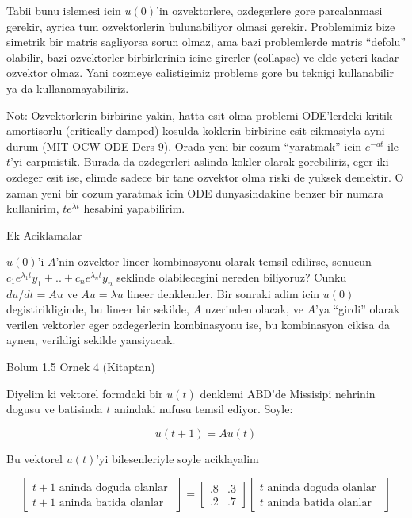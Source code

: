 \documentclass[12pt,fleqn]{article}\usepackage{../common}
\begin{document}
Tabii bunu islemesi icin $u(0)$'in ozvektorlere, ozdegerlere gore
parcalanmasi gerekir, ayrica tum ozvektorlerin bulunabiliyor olmasi
gerekir. Problemimiz bize simetrik bir matris sagliyorsa sorun olmaz, ama
bazi problemlerde matris ``defolu'' olabilir, bazi ozvektorler
birbirlerinin icine girerler (collapse) ve elde yeteri kadar ozvektor
olmaz. Yani cozmeye calistigimiz probleme gore bu teknigi kullanabilir ya
da kullanamayabiliriz. 

Not: Ozvektorlerin birbirine yakin, hatta esit olma problemi ODE'lerdeki
kritik amortisorlu (critically damped) kosulda koklerin birbirine esit
cikmasiyla ayni durum (MIT OCW ODE Ders 9). Orada yeni bir cozum
``yaratmak'' icin $e^{-at}$ ile $t$'yi carpmistik. Burada da ozdegerleri
aslinda kokler olarak gorebiliriz, eger iki ozdeger esit ise, elimde sadece
bir tane ozvektor olma riski de yuksek demektir. O zaman yeni bir cozum
yaratmak icin ODE dunyasindakine benzer bir numara kullanirim, $te^{\lambda
  t}$ 
hesabini yapabilirim. 

Ek Aciklamalar

$u(0)$'i $A$'nin ozvektor lineer kombinasyonu olarak temsil edilirse,
sonucun $c_1e^{\lambda_1t}y_1 + .. + c_ne^{\lambda_n t}y_n$ seklinde
olabilecegini nereden biliyoruz?  Cunku $du/dt = Au$ ve $Au = \lambda u$
lineer denklemler. Bir sonraki adim icin $u(0)$ degistirildiginde, bu
lineer bir sekilde, $A$ uzerinden olacak, ve $A$'ya ``girdi'' olarak
verilen vektorler eger ozdegerlerin kombinasyonu ise, bu kombinasyon cikisa
da aynen, verildigi sekilde yansiyacak.

Bolum 1.5 Ornek 4 (Kitaptan)

Diyelim ki vektorel formdaki bir $u(t)$ denklemi ABD'de Missisipi nehrinin
dogusu ve batisinda $t$ anindaki nufusu temsil ediyor. Soyle:

\[ u(t+1) = Au(t) \]

Bu vektorel $u(t)$'yi bilesenleriyle soyle aciklayalim

\[ 
\left[\begin{array}{r}
t+1 \textrm{ aninda doguda olanlar } \\
t+1 \textrm{ aninda batida olanlar } 
\end{array}\right]
=
\left[\begin{array}{rr}
.8 & .3 \\
.2 & .7
\end{array}\right]
\left[\begin{array}{r}
t \textrm{ aninda doguda olanlar } \\
t \textrm{ aninda batida olanlar } 
\end{array}\right]
 \]
\end{document}
